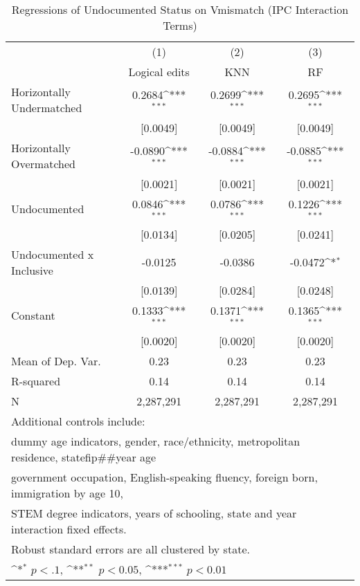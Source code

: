 \begin{table}[htbp]\centering
\def\sym#1{\ifmmode^{#1}\else\(^{#1}\)\fi}
\caption{Regressions of Undocumented Status on Vmismatch (IPC Interaction Terms)}
\begin{tabular}{l*{3}{c}}
\toprule
                    &\multicolumn{1}{c}{(1)}         &\multicolumn{1}{c}{(2)}         &\multicolumn{1}{c}{(3)}         \\
                    &Logical edits         &         KNN         &          RF         \\
\midrule
Horizontally Undermatched&      0.2684\sym{***}&      0.2699\sym{***}&      0.2695\sym{***}\\
                    &    [0.0049]         &    [0.0049]         &    [0.0049]         \\
\addlinespace
Horizontally Overmatched&     -0.0890\sym{***}&     -0.0884\sym{***}&     -0.0885\sym{***}\\
                    &    [0.0021]         &    [0.0021]         &    [0.0021]         \\
\addlinespace
Undocumented        &      0.0846\sym{***}&      0.0786\sym{***}&      0.1226\sym{***}\\
                    &    [0.0134]         &    [0.0205]         &    [0.0241]         \\
\addlinespace
Undocumented x Inclusive&     -0.0125         &     -0.0386         &     -0.0472\sym{*}  \\
                    &    [0.0139]         &    [0.0284]         &    [0.0248]         \\
\addlinespace
Constant            &      0.1333\sym{***}&      0.1371\sym{***}&      0.1365\sym{***}\\
                    &    [0.0020]         &    [0.0020]         &    [0.0020]         \\
\midrule
Mean of Dep. Var.   &        0.23         &        0.23         &        0.23         \\
R-squared           &        0.14         &        0.14         &        0.14         \\
N                   &   2,287,291         &   2,287,291         &   2,287,291         \\
\bottomrule
\multicolumn{4}{l}{\footnotesize Additional controls include:}\\
\multicolumn{4}{l}{\footnotesize dummy age indicators, gender, race/ethnicity, metropolitan residence, statefip##year age}\\
\multicolumn{4}{l}{\footnotesize government occupation, English-speaking fluency, foreign born, immigration by age 10,}\\
\multicolumn{4}{l}{\footnotesize STEM degree indicators, years of schooling, state and year interaction fixed effects.}\\
\multicolumn{4}{l}{\footnotesize Robust standard errors are all clustered by state.}\\
\multicolumn{4}{l}{\footnotesize \sym{*} \(p<.1\), \sym{**} \(p<0.05\), \sym{***} \(p<0.01\)}\\
\end{tabular}
\end{table}
